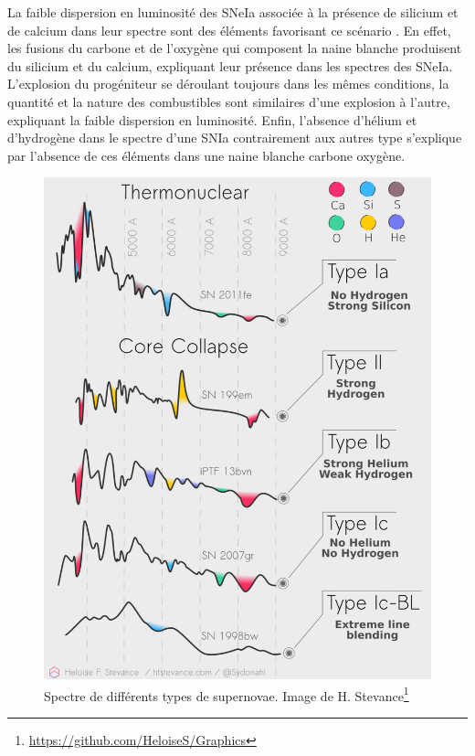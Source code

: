 \documentclass[../main/main.tex]{subfiles}
\begin{document}
La faible dispersion en luminosité
des SNeIa associée à la présence de silicium et de calcium dans leur spectre
sont des éléments favorisant ce scénario \citep{Hoyle1960}. En effet,
les fusions du carbone et de l'oxygène qui composent la naine blanche
produisent du silicium et du calcium, expliquant leur présence dans les
spectres des SNeIa. L'explosion du progéniteur se déroulant toujours
dans les mêmes conditions, la quantité et la nature des combustibles sont
similaires d'une explosion à l'autre, expliquant la faible dispersion en
luminosité. Enfin, l'absence d'hélium et d'hydrogène dans le spectre
d'une SNIa contrairement aux autres type s'explique par l'absence de ces
éléments dans une naine blanche carbone oxygène.


\begin{figure}[ht]
  \begin{minipage}[c]{0.59\textwidth}
    \includegraphics[width=\textwidth]{../figures/01bis_sne/snetype.pdf}
  \end{minipage}\hfill
  \begin{minipage}[c]{0.4\textwidth}
    \caption[Spectre de différents types de supernovae.]{Spectre de
      différents types de supernovae. Image de H. Stevance\footnote{\url{https://github.com/HeloiseS/Graphics}}}\label{fig:snetypes}
  \end{minipage}
\end{figure}
\end{document}
